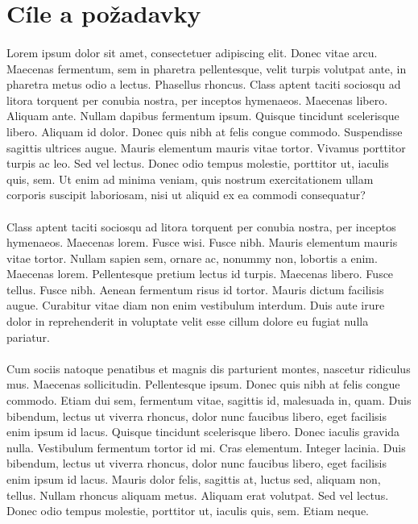 \documentclass[12pt, a4paper]{article}
\begin{document}
	\newpage
	\section{Cíle a požadavky}
	\paragraph{} Lorem ipsum dolor sit amet, consectetuer adipiscing elit. Donec vitae arcu. Maecenas fermentum, sem in pharetra pellentesque, velit turpis volutpat ante, in pharetra metus odio a lectus. Phasellus rhoncus. Class aptent taciti sociosqu ad litora torquent per conubia nostra, per inceptos hymenaeos. Maecenas libero. Aliquam ante. Nullam dapibus fermentum ipsum. Quisque tincidunt scelerisque libero. Aliquam id dolor. Donec quis nibh at felis congue commodo. Suspendisse sagittis ultrices augue. Mauris elementum mauris vitae tortor. Vivamus porttitor turpis ac leo. Sed vel lectus. Donec odio tempus molestie, porttitor ut, iaculis quis, sem. Ut enim ad minima veniam, quis nostrum exercitationem ullam corporis suscipit laboriosam, nisi ut aliquid ex ea commodi consequatur?
	\paragraph{} Class aptent taciti sociosqu ad litora torquent per conubia nostra, per inceptos hymenaeos. Maecenas lorem. Fusce wisi. Fusce nibh. Mauris elementum mauris vitae tortor. Nullam sapien sem, ornare ac, nonummy non, lobortis a enim. Maecenas lorem. Pellentesque pretium lectus id turpis. Maecenas libero. Fusce tellus. Fusce nibh. Aenean fermentum risus id tortor. Mauris dictum facilisis augue. Curabitur vitae diam non enim vestibulum interdum. Duis aute irure dolor in reprehenderit in voluptate velit esse cillum dolore eu fugiat nulla pariatur.
	\paragraph{} Cum sociis natoque penatibus et magnis dis parturient montes, nascetur ridiculus mus. Maecenas sollicitudin. Pellentesque ipsum. Donec quis nibh at felis congue commodo. Etiam dui sem, fermentum vitae, sagittis id, malesuada in, quam. Duis bibendum, lectus ut viverra rhoncus, dolor nunc faucibus libero, eget facilisis enim ipsum id lacus. Quisque tincidunt scelerisque libero. Donec iaculis gravida nulla. Vestibulum fermentum tortor id mi. Cras elementum. Integer lacinia. Duis bibendum, lectus ut viverra rhoncus, dolor nunc faucibus libero, eget facilisis enim ipsum id lacus. Mauris dolor felis, sagittis at, luctus sed, aliquam non, tellus. Nullam rhoncus aliquam metus. Aliquam erat volutpat. Sed vel lectus. Donec odio tempus molestie, porttitor ut, iaculis quis, sem. Etiam neque.
	
\end{document}
